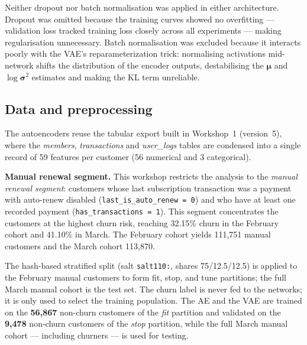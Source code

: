 \documentclass{article}
\begin{document}
Neither dropout nor batch normalisation was applied in either architecture.
Dropout was omitted because the training curves showed no overfitting --- validation
loss tracked training loss closely across all experiments --- making regularisation
unnecessary. Batch normalisation was excluded because it interacts poorly with the
VAE's reparameterization trick: normalising activations mid-network shifts the
distribution of the encoder outputs, destabilising the $\boldsymbol{\mu}$ and
$\log\boldsymbol{\sigma}^2$ estimates and making the KL term unreliable.

\subsection{Data and preprocessing}

The autoencoders reuse the tabular export built in Workshop~1 (version~5), where the
\textit{members}, \textit{transactions} and \textit{user\_logs} tables are condensed into a
single record of 59 features per customer (56 numerical and 3 categorical).

\textbf{Manual renewal segment.} This workshop restricts the analysis to the
\textit{manual renewal segment}: customers whose last subscription transaction was a
payment with auto-renew disabled (\texttt{last\_is\_auto\_renew\,=\,0}) and who have
at least one recorded payment (\texttt{has\_transactions\,=\,1}). This segment
concentrates the customers at the highest churn risk, reaching 32.15\% churn in
the February cohort and 41.10\% in March. The February cohort yields
111{,}751 manual customers and the March cohort 113{,}870.

The hash-based stratified split (salt \texttt{salt110:}, shares 75/12.5/12.5) is
applied to the February manual customers to form fit, stop, and tune partitions;
the full March manual cohort is the test set.
The churn label is never fed to the networks; it is only used to select the
training population. The AE and the VAE are trained on the \textbf{56{,}867}
non-churn customers of the \textit{fit} partition and validated on the \textbf{9{,}478}
non-churn customers of the \textit{stop} partition, while the full March manual
cohort --- including churners --- is used for testing.
\end{document}
